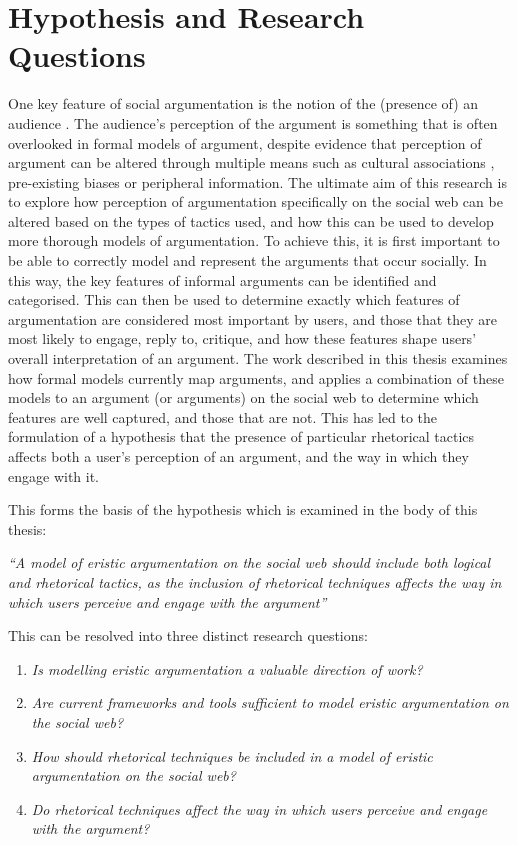 \section{Hypothesis and Research Questions}
\label{introduction:hypothesis}
One key feature of social argumentation is the notion of the (presence of) an audience \citep{Van2004, jimenez2007}. The audience's perception of the argument is something that is often overlooked in formal models of argument, despite evidence that perception of argument can be altered through multiple means such as cultural associations \citep{suzuki2011}, pre-existing biases \citep{Arceneaux2012} or peripheral information\citep{lee2014}. The ultimate aim of this research is to explore how perception of argumentation specifically on the social web can be altered based on the types of tactics used, and how this can be used to develop more thorough models of argumentation. To achieve this, it is first important to be able to correctly model and represent the arguments that occur socially. In this way, the key features of informal arguments can be identified and categorised. This can then be used to determine exactly which features of argumentation are considered most important by users, and those that they are most likely to engage, reply to, critique, and how these features shape users' overall interpretation of an argument. The work described in this thesis examines how formal models currently map arguments, and applies a combination of these models to an argument (or arguments) on the social web to determine which features are well captured, and those that are not. This has led to the formulation of a hypothesis that the presence of particular rhetorical tactics affects both a user's perception of an argument, and the way in which they engage with it.

This forms the basis of the hypothesis which is examined in the body of this thesis:

\textit{``A model of eristic argumentation on the social web should include both logical and rhetorical tactics, as the inclusion of rhetorical techniques affects the way in which users perceive and engage with the argument''}

This can be resolved into three distinct research questions:
\begin{enumerate}
\item \textit{Is modelling eristic argumentation a valuable direction of work?}
\item \textit{Are current frameworks and tools sufficient to model eristic argumentation on the social web?}
\item \textit{How should rhetorical techniques be included in a model of eristic argumentation on the social web?}
\item \textit{Do rhetorical techniques affect the way in which users perceive and engage with the argument?}
\end{enumerate}

